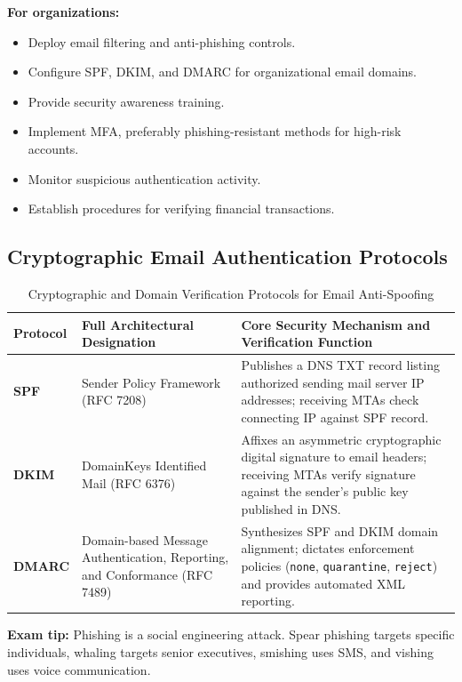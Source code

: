 \textbf{For organizations:}

\begin{itemize}
\item Deploy email filtering and anti-phishing controls.
\item Configure SPF, DKIM, and DMARC for organizational email domains.
\item Provide security awareness training.
\item Implement MFA, preferably phishing-resistant methods for high-risk accounts.
\item Monitor suspicious authentication activity.
\item Establish procedures for verifying financial transactions.
\end{itemize}

\subsection{Cryptographic Email Authentication Protocols}

\begin{table}[htbp]
\centering
\caption{Cryptographic and Domain Verification Protocols for Email Anti-Spoofing}
\label{tab:email_security_protocols}
\begin{tabularx}{\textwidth}{p{2.2cm} p{4.8cm} X}
\toprule
\textbf{Protocol} & \textbf{Full Architectural Designation} & \textbf{Core Security Mechanism and Verification Function} \\
\midrule
\textbf{SPF} & Sender Policy Framework (RFC 7208) & Publishes a DNS TXT record listing authorized sending mail server IP addresses; receiving MTAs check connecting IP against SPF record. \\
\textbf{DKIM} & DomainKeys Identified Mail (RFC 6376) & Affixes an asymmetric cryptographic digital signature to email headers; receiving MTAs verify signature against the sender's public key published in DNS. \\
\textbf{DMARC} & Domain-based Message Authentication, Reporting, and Conformance (RFC 7489) & Synthesizes SPF and DKIM domain alignment; dictates enforcement policies (\texttt{none}, \texttt{quarantine}, \texttt{reject}) and provides automated XML reporting. \\
\bottomrule
\end{tabularx}
\end{table}


\textbf{Exam tip:} Phishing is a social engineering attack. Spear phishing targets specific individuals, whaling targets senior executives, smishing uses SMS, and vishing uses voice communication.



